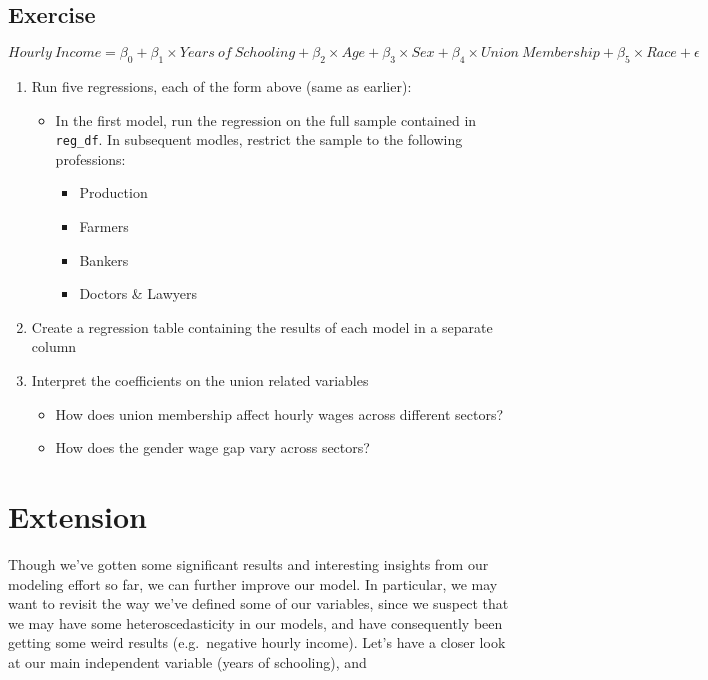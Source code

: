 \documentclass[
  letterpaper,
  DIV=11,
  numbers=noendperiod]{scrreprt}
\providecommand{\tightlist}{%
  \setlength{\itemsep}{0pt}\setlength{\parskip}{0pt}}\usepackage{longtable,booktabs,array}
\begin{document}
\hypertarget{exercise-25}{%
\subsection{Exercise}\label{exercise-25}}

\[ Hourly\ Income= \beta_0 + \beta_1 \times Years\ of\ Schooling + \beta_2 \times Age + \beta_3 \times Sex + \beta_4 \times Union\ Membership + \beta_5 \times Race +\epsilon \]

\begin{enumerate}
\def\labelenumi{\arabic{enumi}.}
\tightlist
\item
  Run five regressions, each of the form above (same as earlier):

  \begin{itemize}
  \tightlist
  \item
    In the first model, run the regression on the full sample contained
    in \texttt{reg\_df}. In subsequent modles, restrict the sample to
    the following professions:

    \begin{itemize}
    \tightlist
    \item
      Production
    \item
      Farmers
    \item
      Bankers
    \item
      Doctors \& Lawyers
    \end{itemize}
  \end{itemize}
\item
  Create a regression table containing the results of each model in a
  separate column
\item
  Interpret the coefficients on the union related variables

  \begin{itemize}
  \tightlist
  \item
    How does union membership affect hourly wages across different
    sectors?
  \item
    How does the gender wage gap vary across sectors?
  \end{itemize}
\end{enumerate}

\hypertarget{extension-3}{%
\section{Extension}\label{extension-3}}

Though we've gotten some significant results and interesting insights
from our modeling effort so far, we can further improve our model. In
particular, we may want to revisit the way we've defined some of our
variables, since we suspect that we may have some heteroscedasticity in
our models, and have consequently been getting some weird results
(e.g.~negative hourly income). Let's have a closer look at our main
independent variable (years of schooling), and
\end{document}
